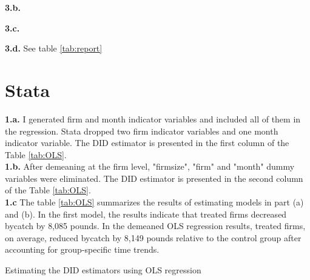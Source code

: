\documentclass{article}
\begin{document}
\noindent \textbf{3.b.} 

\noindent \textbf{3.c.} 

\noindent \textbf{3.d.} See table \ref{tab:report}




\section{Stata}

\noindent \textbf{1.a.} I generated firm and month indicator variables and included all of them in the regression. Stata dropped two firm indicator variables and one month indicator variable. The DID estimator is presented in the first column of the Table \ref{tab:OLS}. \\

\noindent \textbf{1.b.} After demeaning at the firm level, "firmsize", "firm" and "month" dummy variables were eliminated. The DID estimator is presented in the second column of the Table \ref{tab:OLS}. \\

\noindent \textbf{1.c} The table \ref{tab:OLS} summarizes the results of estimating models in part (a) and (b). In the first model, the results indicate that treated firms decreased bycatch by 8,085 pounds. In the demeaned OLS regression results, treated firms, on average, reduced bycatch by 8,149 pounds relative to the control group after accounting for group-specific time trends.

\begin{table}[]
    \centering
    
    \caption{Estimating the DID estimators using OLS regression}
    \label{tab:OLS}
\end{table}
\end{document}
